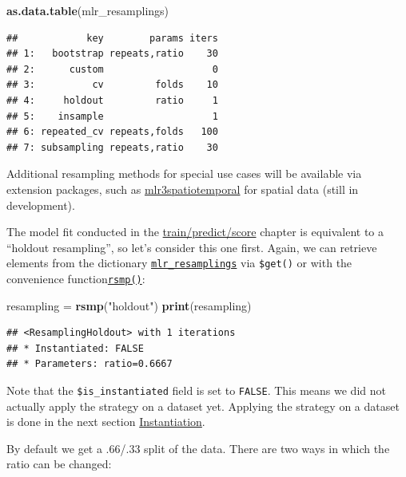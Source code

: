 \documentclass[]{article}
\newenvironment{Shaded}{\begin{snugshade}}{\end{snugshade}}
\newcommand{\KeywordTok}[1]{\textcolor[rgb]{0.13,0.29,0.53}{\textbf{#1}}}
\newcommand{\NormalTok}[1]{#1}
\newcommand{\StringTok}[1]{\textcolor[rgb]{0.31,0.60,0.02}{#1}}
\renewenvironment{Shaded} {\begin{snugshade}\small} {\end{snugshade}}
\begin{document}
\begin{Shaded}
\begin{Highlighting}[]
\KeywordTok{as.data.table}\NormalTok{(mlr_resamplings)}
\end{Highlighting}
\end{Shaded}

\begin{verbatim}
##            key        params iters
## 1:   bootstrap repeats,ratio    30
## 2:      custom                   0
## 3:          cv         folds    10
## 4:     holdout         ratio     1
## 5:    insample                   1
## 6: repeated_cv repeats,folds   100
## 7: subsampling repeats,ratio    30
\end{verbatim}

Additional resampling methods for special use cases will be available via extension packages, such as \href{https://github.com/mlr-org/mlr3spatiotemporal}{mlr3spatiotemporal} for spatial data (still in development).

The model fit conducted in the \protect\hyperlink{train-predict}{train/predict/score} chapter is equivalent to a ``holdout resampling'', so let's consider this one first.
Again, we can retrieve elements from the dictionary \href{https://mlr3.mlr-org.com/reference/mlr_resamplings.html}{\texttt{mlr\_resamplings}} via \texttt{\$get()} or with the convenience function\href{https://mlr3.mlr-org.com/reference/mlr_sugar.html}{\texttt{rsmp()}}:

\begin{Shaded}
\begin{Highlighting}[]
\NormalTok{resampling =}\StringTok{ }\KeywordTok{rsmp}\NormalTok{(}\StringTok{"holdout"}\NormalTok{)}
\KeywordTok{print}\NormalTok{(resampling)}
\end{Highlighting}
\end{Shaded}

\begin{verbatim}
## <ResamplingHoldout> with 1 iterations
## * Instantiated: FALSE
## * Parameters: ratio=0.6667
\end{verbatim}

Note that the \texttt{\$is\_instantiated} field is set to \texttt{FALSE}.
This means we did not actually apply the strategy on a dataset yet.
Applying the strategy on a dataset is done in the next section \protect\hyperlink{instantiation}{Instantiation}.

By default we get a .66/.33 split of the data.
There are two ways in which the ratio can be changed:
\end{document}
